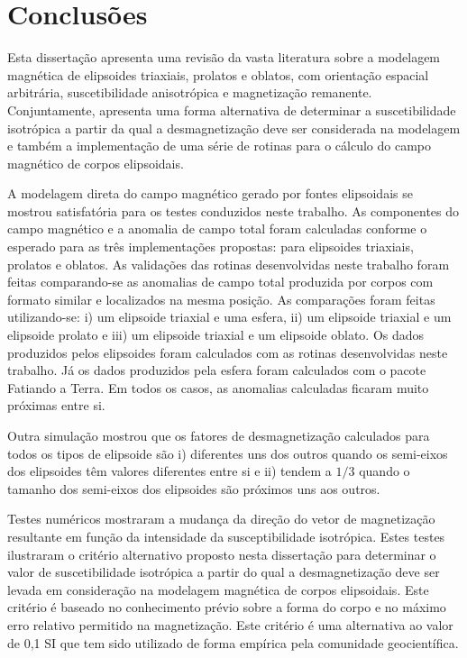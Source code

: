 \chapter{Conclusões}

Esta dissertação apresenta uma revisão da vasta literatura sobre a modelagem magnética de elipsoides triaxiais, prolatos e oblatos, com orientação espacial arbitrária, suscetibilidade anisotrópica e magnetização remanente. Conjuntamente, apresenta uma forma alternativa de determinar a suscetibilidade isotrópica a partir da qual a desmagnetização deve ser considerada na modelagem e também a implementação de uma série de rotinas para o cálculo do campo magnético de corpos elipsoidais.

A modelagem direta do campo magnético gerado por fontes elipsoidais se mostrou satisfatória para os testes conduzidos neste trabalho. As componentes do campo magnético e a anomalia de campo total foram calculadas conforme o esperado para as três implementações propostas: para elipsoides triaxiais, prolatos e oblatos.
As validações das rotinas desenvolvidas neste trabalho foram feitas comparando-se as anomalias de campo total produzida por corpos com formato similar e localizados na mesma posição. As comparações foram feitas utilizando-se: i) um elipsoide triaxial e uma esfera, ii) um elipsoide triaxial e um elipsoide prolato e iii) um elipsoide triaxial e um elipsoide oblato. Os dados produzidos pelos elipsoides foram calculados com as rotinas desenvolvidas neste trabalho. Já os dados produzidos pela esfera foram calculados com o pacote Fatiando a Terra. Em todos os casos, as anomalias calculadas ficaram muito próximas entre si.

Outra simulação mostrou que os fatores de desmagnetização calculados para todos os tipos de elipsoide são i) diferentes  uns dos outros quando os semi-eixos dos elipsoides têm valores diferentes entre si e ii) tendem a $1/3$ quando o tamanho dos semi-eixos dos elipsoides são próximos uns aos outros.

Testes numéricos mostraram a mudança da direção do vetor de magnetização resultante em função da intensidade da susceptibilidade isotrópica. Estes testes ilustraram o critério alternativo proposto nesta dissertação para determinar o valor de suscetibilidade isotrópica a partir do qual a desmagnetização deve ser levada em consideração na modelagem magnética de corpos elipsoidais. Este critério é baseado no conhecimento prévio sobre a forma do corpo e no máximo erro relativo permitido na magnetização. Este critério é uma alternativa ao valor de 0,1 SI que tem sido utilizado de forma empírica pela comunidade geocientífica.

